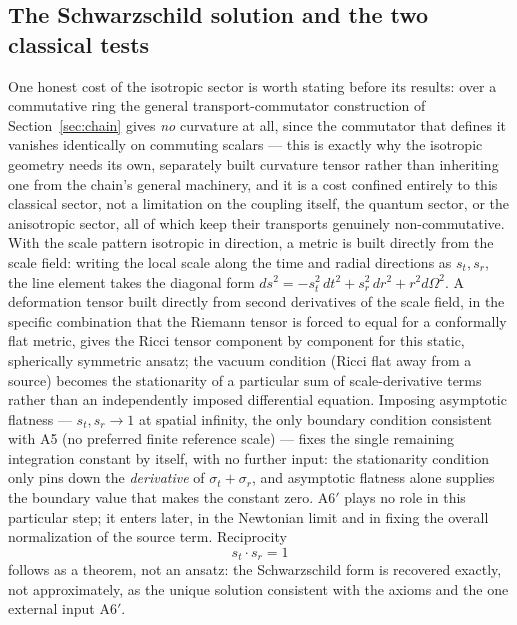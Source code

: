 \documentclass[pdflatex,sn-mathphys-num]{sn-jnl}
\theoremstyle{thmstyleone}
\theoremstyle{thmstylethree}
\theoremstyle{thmstyletwo}
\begin{document}
\subsection{The Schwarzschild solution and the two classical tests}

One honest cost of the isotropic sector is worth stating before its
results: over a commutative ring the general transport-commutator
construction of Section~\ref{sec:chain} gives \emph{no} curvature at
all, since the commutator that defines it vanishes identically on
commuting scalars — this is exactly why the isotropic geometry needs its
own, separately built curvature tensor rather than inheriting one from
the chain's general machinery, and it is a cost confined entirely to
this classical sector, not a limitation on the coupling itself, the
quantum sector, or the anisotropic sector, all of which keep their
transports genuinely non-commutative. With the scale pattern isotropic
in direction, a metric is built directly
from the scale field: writing the local scale along the time and radial
directions as $s_t, s_r$, the line element takes the diagonal form
$ds^2 = -s_t^2\,dt^2 + s_r^2\,dr^2 + r^2 d\Omega^2$. A deformation
tensor built directly from second derivatives of the scale field, in the
specific combination that the Riemann tensor is forced to equal for a
conformally flat metric, gives the Ricci tensor component by component
for this static, spherically symmetric ansatz; the
vacuum condition (Ricci flat away from a source) becomes the
stationarity of a particular sum of scale-derivative terms rather than
an independently imposed differential equation. Imposing asymptotic
flatness — $s_t, s_r \to 1$ at spatial infinity, the only boundary
condition consistent with A5 (no preferred finite reference scale) —
fixes the single remaining integration constant by itself, with no
further input: the stationarity condition only pins down the
\emph{derivative} of $\sigma_t+\sigma_r$, and asymptotic flatness alone
supplies the boundary value that makes the constant zero. A6$'$ plays no
role in this particular step; it enters later, in the Newtonian limit
and in fixing the overall normalization of the source term. Reciprocity
\begin{equation}
s_t \cdot s_r = 1
\end{equation}
follows as a theorem, not an ansatz: the Schwarzschild form is recovered
exactly, not approximately, as the unique solution consistent with the
axioms and the one external input A6$'$.
\end{document}

